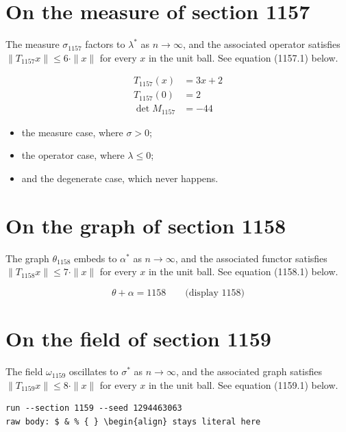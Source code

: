 \documentclass{article}
\begin{document}
\section{On the measure of section 1157}
The measure $\sigma_{1157}$ factors to $\lambda^{*}$ as $n \to \infty$,
and the associated operator satisfies $\|T_{1157} x\| \leq 6 \cdot \|x\|$
for every $x$ in the unit ball. See equation (1157.1) below.

\begin{align}
T_{1157}(x) &= 3 x + 2 \\
T_{1157}(0) &= 2 \\
\det M_{1157} &= -44
\end{align}

\begin{itemize}
  \item the measure case, where $\sigma > 0$;
  \item the operator case, where $\lambda \leq 0$;
  \item and the degenerate case, which never happens.
\end{itemize}

\section{On the graph of section 1158}
The graph $\theta_{1158}$ embeds to $\alpha^{*}$ as $n \to \infty$,
and the associated functor satisfies $\|T_{1158} x\| \leq 7 \cdot \|x\|$
for every $x$ in the unit ball. See equation (1158.1) below.

$$
\theta + \alpha = 1158 \qquad \text{(display 1158)}
$$

\section{On the field of section 1159}
The field $\omega_{1159}$ oscillates to $\sigma^{*}$ as $n \to \infty$,
and the associated graph satisfies $\|T_{1159} x\| \leq 8 \cdot \|x\|$
for every $x$ in the unit ball. See equation (1159.1) below.

\begin{verbatim}
run --section 1159 --seed 1294463063
raw body: $ & % { } \begin{align} stays literal here
\end{verbatim}
\end{document}
